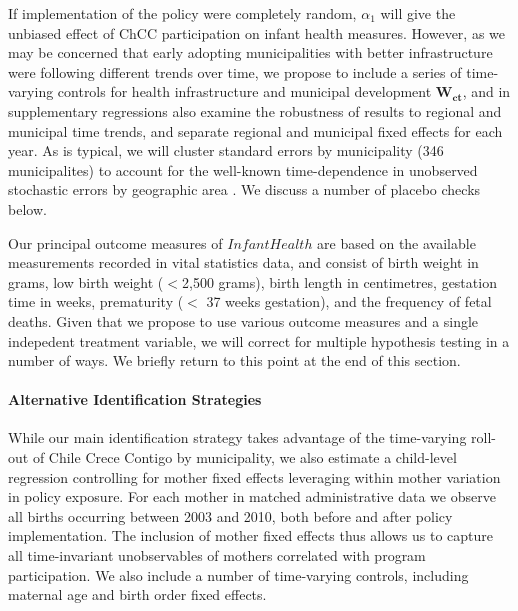 \documentclass[12pt]{article}
\begin{document}
\begin{spacing}{1.4}
If implementation of the policy were completely random,
$\alpha_1$ will give the unbiased effect of ChCC participation on
infant health measures.  However, as we may be concerned that
early adopting municipalities with better infrastructure were
following different trends over time, we propose to include
a series of time-varying controls for health infrastructure
and municipal development $\bm{W_{ct}}$, and in supplementary
regressions also examine the robustness of results to regional
and municipal time trends, and separate regional and municipal
fixed effects for each year. %
As is typical, we will cluster standard errors by municipality
(346 municipalites) to account for the well-known time-dependence
in unobserved stochastic errors by geographic area
\citep{Bertrandetal2004,CameronMiller2015}.  We discuss a number
of placebo checks below.

Our principal outcome measures of $InfantHealth$ are based on
the available measurements recorded in vital statistics data,
and consist of birth weight in grams, low birth weight
($<$2,500 grams), birth length in centimetres, gestation time
in weeks, prematurity ($<$ 37 weeks gestation), and the frequency
of fetal deaths.  Given that we propose to use various outcome
measures and a single indepedent treatment variable, we will
correct for multiple hypothesis testing in a number of ways.  We
briefly return to this point at the end of this section.

\paragraph{Alternative Identification Strategies}
While our main identification strategy takes advantage of
the time-varying roll-out of Chile Crece Contigo by municipality,
we also estimate a child-level regression controlling for mother
fixed effects leveraging within mother variation in policy exposure.
For each mother in matched administrative data we observe all
births occurring between 2003 and 2010, both before and after policy
implementation.  The inclusion of mother fixed effects thus allows
us to capture all time-invariant unobservables of mothers correlated
with program participation.  We also include a number of time-varying
controls, including maternal age and birth order fixed effects.


\end{spacing}
\end{document}
